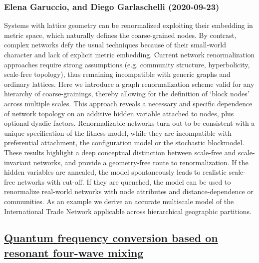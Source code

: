 \subsubsection*{Elena Garuccio, and Diego Garlaschelli (2020-09-23)}
Systems with lattice geometry can be renormalized exploiting their embedding
in metric space, which naturally defines the coarse-grained nodes. By contrast,
complex networks defy the usual techniques because of their small-world
character and lack of explicit metric embedding. Current network
renormalization approaches require strong assumptions (e.g. community
structure, hyperbolicity, scale-free topology), thus remaining incompatible
with generic graphs and ordinary lattices. Here we introduce a graph
renormalization scheme valid for any hierarchy of coarse-grainings, thereby
allowing for the definition of `block nodes' across multiple scales. This
approach reveals a necessary and specific dependence of network topology on an
additive hidden variable attached to nodes, plus optional dyadic factors.
Renormalizable networks turn out to be consistent with a unique specification
of the fitness model, while they are incompatible with preferential attachment,
the configuration model or the stochastic blockmodel. These results highlight a
deep conceptual distinction between scale-free and scale-invariant networks,
and provide a geometry-free route to renormalization. If the hidden variables
are annealed, the model spontaneously leads to realistic scale-free networks
with cut-off. If they are quenched, the model can be used to renormalize
real-world networks with node attributes and distance-dependence or
communities. As an example we derive an accurate multiscale model of the
International Trade Network applicable across hierarchical geographic
partitions.

\subsection*{\href{http://arxiv.org/abs/2009.11021v1}{Quantum frequency conversion based on resonant four-wave mixing}}
